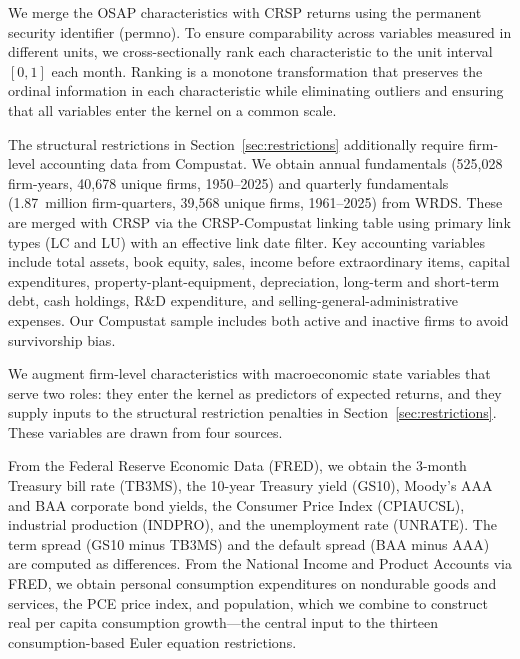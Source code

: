 We merge the OSAP characteristics with CRSP returns using the permanent security identifier (permno).
To ensure comparability across variables measured in different units, we cross-sectionally rank each characteristic to the unit interval $[0,1]$ each month.
Ranking is a monotone transformation that preserves the ordinal information in each characteristic while eliminating outliers and ensuring that all variables enter the kernel on a common scale.

The structural restrictions in Section~\ref{sec:restrictions} additionally require firm-level accounting data from Compustat.
We obtain annual fundamentals (525,028 firm-years, 40,678 unique firms, 1950--2025) and quarterly fundamentals (1.87~million firm-quarters, 39,568 unique firms, 1961--2025) from WRDS.
These are merged with CRSP via the CRSP-Compustat linking table using primary link types (LC and LU) with an effective link date filter.
Key accounting variables include total assets, book equity, sales, income before extraordinary items, capital expenditures, property-plant-equipment, depreciation, long-term and short-term debt, cash holdings, R\&D expenditure, and selling-general-administrative expenses.
Our Compustat sample includes both active and inactive firms to avoid survivorship bias.

We augment firm-level characteristics with macroeconomic state variables that serve two roles: they enter the kernel as predictors of expected returns, and they supply inputs to the structural restriction penalties in Section~\ref{sec:restrictions}.
These variables are drawn from four sources.

From the Federal Reserve Economic Data (FRED), we obtain the 3-month Treasury bill rate (TB3MS), the 10-year Treasury yield (GS10), Moody's AAA and BAA corporate bond yields, the Consumer Price Index (CPIAUCSL), industrial production (INDPRO), and the unemployment rate (UNRATE).
The term spread (GS10 minus TB3MS) and the default spread (BAA minus AAA) are computed as differences.
From the National Income and Product Accounts via FRED, we obtain personal consumption expenditures on nondurable goods and services, the PCE price index, and population, which we combine to construct real per capita consumption growth---the central input to the thirteen consumption-based Euler equation restrictions.

